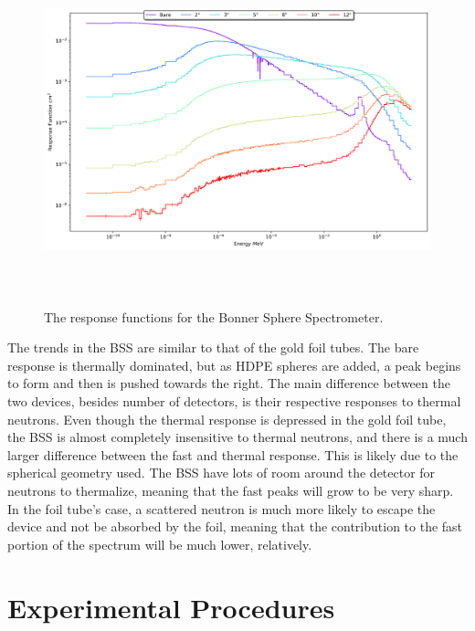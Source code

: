 \begin{figure}[htb]
\centering
\includegraphics[height=4in]{tex/figures/bs.png}
\caption[Bonner Sphere Spectrometer Response Functions]{The response functions for the Bonner Sphere Spectrometer.}
\label{fig:bs_rfs}
\end{figure}

The trends in the BSS are similar to that of the gold foil tubes.
The bare response is thermally dominated, but as HDPE spheres are added, a peak begins to form and then is pushed towards the right.
The main difference between the two devices, besides number of detectors, is their respective responses to thermal neutrons.
Even though the thermal response is depressed in the gold foil tube, the BSS is almost completely insensitive to thermal neutrons, and there is a much larger difference between the fast and thermal response.
This is likely due to the spherical geometry used.
The BSS have lots of room around the detector for neutrons to thermalize, meaning that the fast peaks will grow to be very sharp.
In the foil tube's case, a scattered neutron is much more likely to escape the device and not be absorbed by the foil, meaning that the contribution to the fast portion of the spectrum will be much lower, relatively.

\section{Experimental Procedures}


